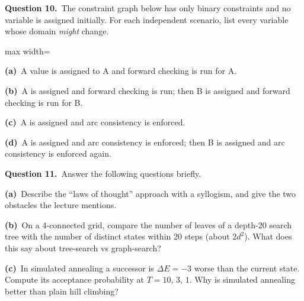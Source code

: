 \documentclass[11pt,a4paper]{article}
\newcommand{\question}[1]{\par\medskip\noindent\textbf{Question #1.}\ }
\newcommand{\subq}[1]{\par\smallskip\noindent\textbf{#1}\ }
\begin{document}
\question{10}The constraint graph below has only binary constraints and no variable is assigned initially. For each independent scenario, list every variable whose domain \emph{might} change.\begin{center}
\begin{adjustbox}{max width=\linewidth}
\end{adjustbox}
\end{center}
\subq{(a)}A value is assigned to A and forward checking is run for A.
\begin{ansbox}[height=0.8cm]\end{ansbox}
\subq{(b)}A is assigned and forward checking is run; then B is assigned and forward checking is run for B.
\begin{ansbox}[height=0.8cm]\end{ansbox}
\subq{(c)}A is assigned and arc consistency is enforced.
\begin{ansbox}[height=0.8cm]\end{ansbox}
\subq{(d)}A is assigned and arc consistency is enforced; then B is assigned and arc consistency is enforced again.
\begin{ansbox}[height=1.2cm]\end{ansbox}
\clearpage
\question{11}Answer the following questions briefly.
\subq{(a)}Describe the ``laws of thought'' approach with a syllogism, and give the two obstacles the lecture mentions.
\begin{ansbox}[height=2.0cm]\end{ansbox}
\subq{(b)}On a 4-connected grid, compare the number of leaves of a depth-20 search tree with the number of distinct states within 20 steps (about $2d^2$). What does this say about tree-search vs graph-search?
\begin{ansbox}[height=1.8cm]\end{ansbox}
\subq{(c)}In simulated annealing a successor is $\Delta E=-3$ worse than the current state. Compute its acceptance probability at $T=10$, $3$, $1$. Why is simulated annealing better than plain hill climbing?
\end{document}
